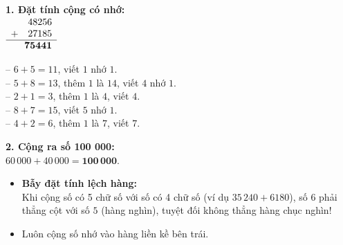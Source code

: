 \documentclass[11pt,a4paper]{article}
\begin{document}
\vspace{-2.5mm}
\noindent
\begin{minipage}[t]{0.49\textwidth}\vspace{0pt}
\begin{tcolorbox}[
  enhanced,
  colback=green!4!white,
  colframe=green!60!black,
  arc=2mm, boxrule=0.8pt,
  left=2mm, right=2mm, top=1.8mm, bottom=1.8mm,
  title={\footnotesize\bfseries\color{white}\faCheckCircle\ Ví dụ thực hành chuẩn mực}
]
{\footnotesize
\textbf{1. Đặt tính cộng có nhớ:}\\
$\begin{array}{r@{}l}
  48256 & \\
  +\quad 27185 & \\
  \hline
  \mathbf{75441} &
\end{array}$
\qquad
\begin{minipage}[c]{0.5\linewidth}
-- $6 + 5 = 11$, viết $1$ nhớ $1$.\\
-- $5 + 8 = 13$, thêm $1$ là $14$, viết $4$ nhớ $1$.\\
-- $2 + 1 = 3$, thêm $1$ là $4$, viết $4$.\\
-- $8 + 7 = 15$, viết $5$ nhớ $1$.\\
-- $4 + 2 = 6$, thêm $1$ là $7$, viết $7$.
\end{minipage}

\textbf{2. Cộng ra số 100 000:}\\
$60\,000 + 40\,000 = \mathbf{100\,000}$.
}
\end{tcolorbox}
\end{minipage}
\hfill
\begin{minipage}[t]{0.49\textwidth}\vspace{0pt}
\begin{tcolorbox}[
  enhanced,
  colback=red!4!white,
  colframe=red!70!black,
  arc=2mm, boxrule=0.8pt,
  left=2mm, right=2mm, top=1.8mm, bottom=1.8mm,
  title={\footnotesize\bfseries\color{white}\faExclamationTriangle\ Mẹo tránh bẫy trắc nghiệm}
]
{\footnotesize
\begin{itemize}\setlength{\itemsep}{1.5pt}\setlength{\leftskip}{-2.5mm}
  \item \textbf{Bẫy đặt tính lệch hàng:}\\
  Khi cộng số có 5 chữ số với số có 4 chữ số (ví dụ $35\,240 + 6180$), số $6$ phải thẳng cột với số $5$ (hàng nghìn), tuyệt đối không thẳng hàng chục nghìn!
  \item Luôn cộng số nhớ vào hàng liền kề bên trái.
\end{itemize}
}
\end{tcolorbox}
\end{minipage}
\end{document}
